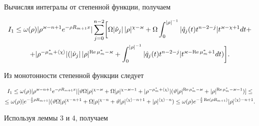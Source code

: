 Вычисляя интегралы от степенной функции, получаем


\begin{multline*}


I_1\le\omega(\rho)|\rho^{\varkappa-n+1}


e^{-\rho R_{m+1}x}|\sum^{n-2}_{j=0}\biggl[\Omega


|\Hat\nu_j|\,|\rho|^{\chi-\varkappa}+


\Omega\int^{|\rho|^{-1}}_0|\Hat q_j(t)t^{n-2-j}|


t^{\varkappa-\chi+1}dt+\\


+|\rho^{-\mu^*_m+\la\chi\ra}|(|\Hat\nu_j|\,


|\rho|^{\re\mu^*_m-\varkappa}+\int^{|\rho|^{-1}}_0


|\Hat q_j(t)t^{n-2-j}|


t^{\varkappa-\re\mu^*_m+1}dt)\biggr].


\end{multline*}


Из монотонности степенной функции следует


\begin{multline*}


I_1\le\omega(\rho)|\rho^{\varkappa-n+1}


e^{-\rho R_{m+1}x}|[\vartheta\Omega|\rho|^{\chi-\varkappa}


+\Omega|\rho|^{\chi-\varkappa-1}


+|\rho^{-\mu^*_m+\la\chi\ra}|


(\vartheta|\rho|^{\re\mu^*_m-\varkappa}+


|\rho|^{\re\mu^*_m-\varkappa-1})]\le \\


\le \omega(\rho)|e^{-\frac{\delta}{2}\rho R_{m+1}}|


(\vartheta\Omega|\rho|^{\chi-n+1}


+\Omega|\rho|^{\chi-n}+\vartheta|\rho|^{\la\chi\ra-n+1}


+|\rho|^{\la\chi\ra-n})\le \omega(\rho)


e^{-\frac{\delta}{2}\re(\rho R_{m+1})}


|\rho|^{\la\chi\ra-n+1}.


\end{multline*}





Используя леммы 3 и 4, получаем


